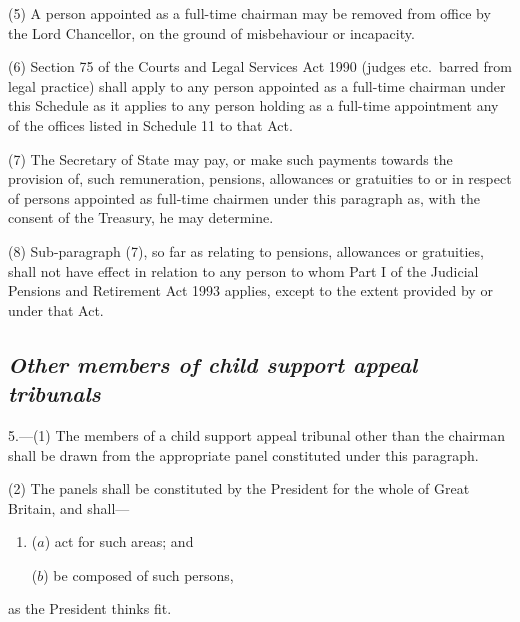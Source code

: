 \documentclass[12pt,a4paper]{article}
\begin{document}

(5) A person appointed as a full-time chairman may be removed from office by the Lord Chancellor, on the ground of misbehaviour or incapacity.

(6) Section 75 of the Courts and Legal Services Act 1990 (judges etc.\ barred from legal practice) shall apply to any person appointed as a full-time chairman under this Schedule as it applies to any person holding as a full-time appointment any of the offices listed in Schedule 11 to that Act.

(7) The Secretary of State may pay, or make such payments towards the provision of, such remuneration, pensions, allowances or gratuities to or in respect of persons appointed as full-time chairmen under this paragraph as, with the consent of the Treasury, he may determine.

(8) Sub-paragraph (7), so far as relating to pensions, allowances or gratuities, shall not have effect in relation to any person to whom Part I of the Judicial Pensions and Retirement Act 1993 applies, except to the extent provided by or under that Act.


\subsection*{\itshape Other members of child support appeal tribunals}

5.---(1) The members of a child support appeal tribunal other than the chairman shall be drawn from the appropriate panel constituted under this paragraph.

(2) The panels shall be constituted by the President for the whole of Great Britain, and shall—
\begin{enumerate}\item[]
($a$) act for such areas; and

($b$) be composed of such persons,
\end{enumerate}
as the President thinks fit.
\end{document}
